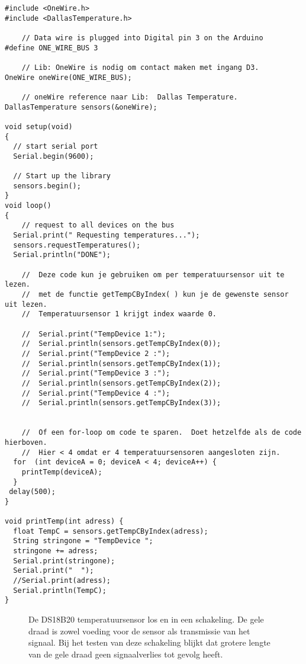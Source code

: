 \begin{verbatim}
#include <OneWire.h>
#include <DallasTemperature.h>
 
    // Data wire is plugged into Digital pin 3 on the Arduino
#define ONE_WIRE_BUS 3
 
    // Lib: OneWire is nodig om contact maken met ingang D3. 
OneWire oneWire(ONE_WIRE_BUS);
 
    // oneWire reference naar Lib:  Dallas Temperature.
DallasTemperature sensors(&oneWire);
 
void setup(void)
{
  // start serial port
  Serial.begin(9600);
  
  // Start up the library
  sensors.begin();  
}
void loop()
{ 
    // request to all devices on the bus
  Serial.print(" Requesting temperatures...");
  sensors.requestTemperatures(); 
  Serial.println("DONE");
  
    //  Deze code kun je gebruiken om per temperatuursensor uit te lezen.
    //  met de functie getTempCByIndex( ) kun je de gewenste sensor uit lezen.
    //  Temperatuursensor 1 krijgt index waarde 0.    

    //  Serial.print("TempDevice 1:");
    //  Serial.println(sensors.getTempCByIndex(0)); 
    //  Serial.print("TempDevice 2 :");
    //  Serial.println(sensors.getTempCByIndex(1));
    //  Serial.print("TempDevice 3 :");
    //  Serial.println(sensors.getTempCByIndex(2));
    //  Serial.print("TempDevice 4 :");
    //  Serial.println(sensors.getTempCByIndex(3));  


    //  Of een for-loop om code te sparen.  Doet hetzelfde als de code hierboven. 
    //  Hier < 4 omdat er 4 temperatuursensoren aangesloten zijn.
  for  (int deviceA = 0; deviceA < 4; deviceA++) {
    printTemp(deviceA);
  }
 delay(500);
}

void printTemp(int adress) {  
  float TempC = sensors.getTempCByIndex(adress);
  String stringone = "TempDevice ";
  stringone += adress;
  Serial.print(stringone);
  Serial.print("  ");
  //Serial.print(adress);
  Serial.println(TempC);  
}
\end{verbatim}


\begin{figure}
    \centering
    \subfloat[]{
        \texttt{[image: DS18B20\_A\_2]}
        \label{fig:DS18B20_A_2}}
    \hfill
    \caption{De DS18B20 temperatuursensor los en in een schakeling. De gele draad 
    is zowel voeding voor de sensor als transmissie van het signaal.
    Bij het testen van deze schakeling blijkt dat grotere lengte van de gele draad 
    geen signaalverlies tot gevolg heeft.}
\end{figure}

